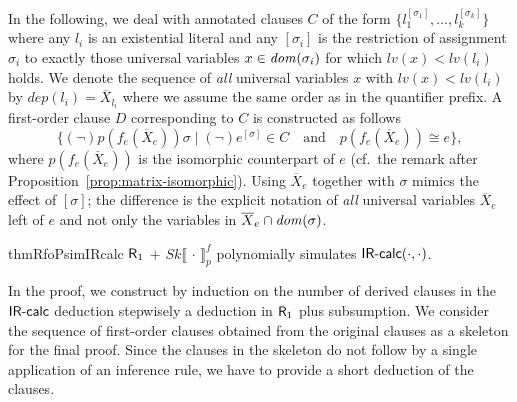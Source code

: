 \documentclass{llncs}
\newcommand{\Rfo}{$\mbox{\sf R}_1$}
\newcommand{\IRcalc}{$\mbox{\sf IR-calc}$}
\newcommand{\IRcalcPM}[2]{$\mbox{\sf IR-calc}(#1,#2)$}
\newcommand{\dom}[1]{\ensuremath\mathit{dom}(#1)}
\newcommand{\sequence}[1]{\overline{#1}}
\newcommand{\restrict}[1]{\ensuremath{[#1]}}
\newcommand{\dep}[1]{\mathit{dep}(#1)}
\newcommand{\SkQBFtoPL}[3]{\mathit{Sk}\llbracket\,#1\,\rrbracket_{#2}^{#3}}
\newcommand{\level}[1]{{\mathit lv(#1)}}
\begin{document}
In the following, we deal with annotated clauses $C$ of the form
$\{l_1^{\restrict{\sigma_1}}, \ldots , l_k^{\restrict{\sigma_k}}\}$
where any $l_i$ is an existential literal and any
$\restrict{\sigma_i}$ is the restriction of assignment $\sigma_i$ to
exactly those universal variables $x\in \dom{\sigma_i}$ for which
$\level{x}<\level{l_i}$ holds. We denote the sequence of \emph{all}
universal variables $x$ with $\level{x}<\level{l_i}$ by $\dep{l_i} =
\sequence{X}_{l_i}$ where we assume the same order as in the
quantifier prefix. A first-order clause $D$ corresponding to $C$ is
constructed as follows
\begin{displaymath}
\big\{(\neg) p(f_e(\sequence{X}_e)) \sigma \mid (\neg)
e^{\restrict{\sigma}} \in C \quad \text{and} \quad 
p(f_e(\sequence{X}_e))\cong e \big\}, 
\end{displaymath}
where $p(f_e(\sequence{X}_e))$ is the isomorphic counterpart of $e$
(cf.\ the remark after Proposition~\ref{prop:matrix-isomorphic}).
Using $\sequence{X}_e$ together with $\sigma$ mimics the effect of
$\restrict{\sigma}$; the difference is the explicit notation of
\emph{all} universal variables $\sequence{X}_{e}$ left of $e$ and not
only the variables in $\sequence{X}_{e}\cap \dom{\sigma}$.

\begin{restatable}{thm}{RfoPsimIRcalc}
\label{Rfo-psim-IRcalc}
\Rfo{} $+$ $\SkQBFtoPL{\cdot}{p}{f}$
polynomially simulates \IRcalcPM{\cdot}{\cdot}.
\end{restatable}


In the proof, we construct by induction on the number of derived
clauses in the \IRcalc{} deduction stepwisely a deduction in \Rfo{}
plus subsumption. We consider the sequence of first-order clauses
obtained from the original clauses as a skeleton for the final
proof. Since the clauses in the skeleton do not follow by a single
application of an inference rule, we have to provide a short deduction
of the clauses.
\end{document}
